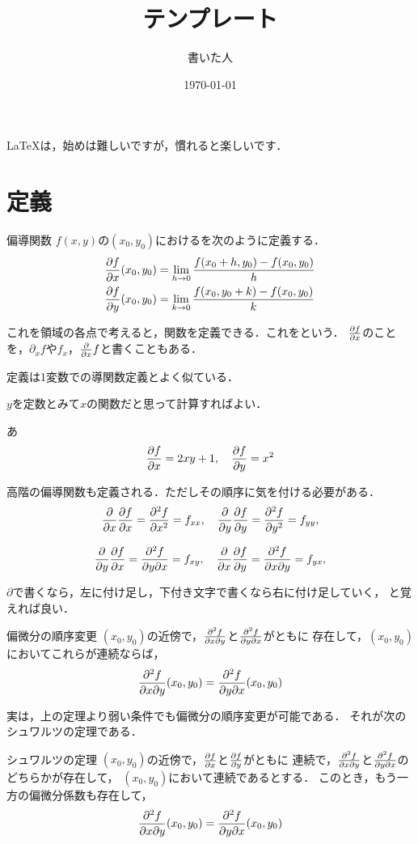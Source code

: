 \documentclass[dvipdfmx,a4j,11pt]{jsarticle}
\title{テンプレート}
\author{書いた人}
\date{\today}
\theoremstyle{mystyle}
\begin{document}
\maketitle


\LaTeX は，始めは難しいですが，慣れると楽しいです．

\section{定義}


\begin{dfn}{偏導関数}{}
   $f(x,y)$の$(x_0,y_0)$におけるを次のように定義する．
   \begin{align}
      \pdv{f}{x}\qty(x_0,y_0)&=\lim_{h\to 0}\frac{f(x_0+h,y_0)-f(x_0,y_0)}{h}\\
      \pdv{f}{y}\qty(x_0,y_0)&=\lim_{k\to 0}\frac{f(x_0,y_0+k)-f(x_0,y_0)}{k} 
   \end{align}
   
   これを領域の各点で考えると，関数を定義できる．これをという．
   $\pdv{f}{x}$のことを，$\partial_x f$や$f_x$，$\pdv{x}f$と書くこともある．
\end{dfn}

定義は1変数での導関数定義とよく似ている．

$y$を定数とみて$x$の関数だと思って計算すればよい．

\begin{ex}{}{}
あ
\[ \pdv{f}{x}=2xy+1, \ \  \ \pdv{f}{y}=x^2\]
\end{ex}



高階の偏導関数も定義される．ただしその順序に気を付ける必要がある．
\[ \pdv{x} \pdv{f}{x} =\pdv[2]{f}{x}=f_{xx},\ \ \
   \pdv{y} \pdv{f}{y} =\pdv[2]{f}{y}=f_{yy},\]

\[ \pdv{y} \pdv{f}{x} =\pdv{f}{y}{x}=f_{xy},\ \ \
   \pdv{x} \pdv{f}{y} =\pdv{f}{x}{y}=f_{yx},\]

$\partial$で書くなら，左に付け足し，下付き文字で書くなら右に付け足していく，
と覚えれば良い．


\begin{prop}{偏微分の順序変更}{}
   $(x_0,y_0)$の近傍で，$\pdv{f}{x}{y}$と$\pdv{f}{y}{x}$がともに
   存在して，$(x_0,y_0)$においてこれらが連続ならば，
   \[ \pdv{f}{x}{y} \qty(x_0,y_0)=\pdv{f}{y}{x} \qty(x_0,y_0) \]
\end{prop}

実は，上の定理より弱い条件でも偏微分の順序変更が可能である．
それが次のシュワルツの定理である．
\begin{thm}{シュワルツの定理}{}
   $(x_0,y_0)$の近傍で，$\pdv{f}{x}$と$\pdv{f}{y}$がともに
   連続で，$\pdv{f}{x}{y}$と$\pdv{f}{y}{x}$のどちらかが存在して，
   $(x_0,y_0)$において連続であるとする．
   このとき，もう一方の偏微分係数も存在して，
   \[ \pdv{f}{x}{y} \qty(x_0,y_0)=\pdv{f}{y}{x} \qty(x_0,y_0) \]
\end{thm}
\end{document}
